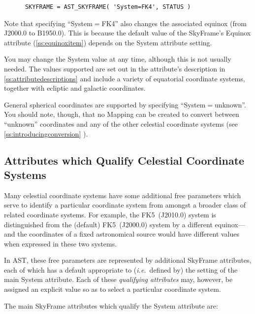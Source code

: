 \documentclass[twoside,11pt]{article}
\newcommand{\htmlref}[2]{#1}
\newcommand{\appref}[1]{Appendix~\ref{#1}}
\newcommand{\secref}[1]{\S\ref{#1}}
\renewcommand{\appref}[1]{\ref{#1}}
\renewcommand{\secref}[1]{\ref{#1}}
\begin{document}
\small
\begin{verbatim}
      SKYFRAME = AST_SKYFRAME( 'System=FK4', STATUS )
\end{verbatim}
\normalsize

Note that specifying ``System$=$FK4'' also changes the associated
equinox (from J2000.0 to B1950.0). This is because the default value
of the SkyFrame's \htmlref{Equinox}{Equinox} attribute (\secref{ss:equinoxitem}) depends
on the System attribute setting.

You may change the System value at any time, although this is not
usually needed.  The values supported are set out in the attribute's
description in \appref{ss:attributedescriptions} and include a variety
of equatorial coordinate systems, together with ecliptic and galactic
coordinates.

General spherical coordinates are supported by specifying
``System$=$unknown''. You should note, though, that no \htmlref{Mapping}{Mapping} can be 
created to convert between ``unknown'' coordinates and any of the other 
celestial coordinate systems (see \secref{ss:introducingconversion} ).

\subsection{Attributes which Qualify Celestial Coordinate Systems}

Many celestial coordinate systems have some additional free parameters
which serve to identify a particular coordinate system from amongst a
broader class of related coordinate systems. For example, the
FK5~(J2010.0) system is distinguished from the (default) FK5~(J2000.0)
system by a different equinox---and the coordinates of a fixed
astronomical source would have different values when expressed in
these two systems.

In AST, these free parameters are represented by additional \htmlref{SkyFrame}{SkyFrame}
attributes, each of which has a default appropriate to
({\em{i.e.}}\ defined by) the setting of the main \htmlref{System}{System}
attribute. Each of these {\em{qualifying attributes}} may, however, be
assigned an explicit value so as to select a particular coordinate
system.

The main SkyFrame attributes which qualify the System attribute are:
\end{document}
